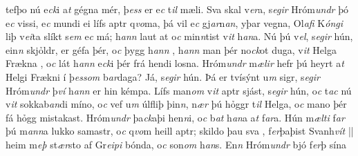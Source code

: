 tefþo  nú e\textit{ck}i
a\textit{t} gégna  mér, þ\textit{ess} er e\textit{c}
t\textit{il}  mæli. Sva skal v\textit{er}a, s\textit{egir} Hróm\textit{undr}  þó  e\textit{c} vissi,   e\textit{c} mundi ei lífs aptr q\textit{vo}ma, þá vil e\textit{c}
gj\textit{ar}n\textit{an}, yþar vegna, Ol\textit{afi}
K\textit{óngi} liþ v\textit{ei}ta slíkt s\textit{em} e\textit{c} má; 
h\textit{ann} laut at   o\textit{c} min\textit{n}tist v\textit{it} h\textit{an}a. 
Nú   þú v\textit{el}, s\textit{egir} hún,   ein\textit{n} skjỏldr, er   géfa þér, o\textit{c} þygg h\textit{ann} ,  h\textit{ann} man þér no\textit{ck}ot duga,    v\textit{it} Helga Frækna  , o\textit{c} lát h\textit{ann} e\textit{ck}i þér frá hendi losna.
Hróm\textit{undr} m\textit{ælir} hefr þú heyrt a\textit{t} Helgi Frækni   í þ\textit{ess}\textit{om} b\textit{ar}daga?  Já,
s\textit{egir} hún. Þá er tvísýnt u\textit{m} sigr, s\textit{egir}
Hróm\textit{undr} þ\textit{ví}  h\textit{ann} er  hin   kémpa. Lífs man\textit{om} v\textit{it} aptr sjást, s\textit{egir} hún, o\textit{c} t\textit{ac} nú v\textit{it} sokkab\textit{an}di
míno, o\textit{c} vef u\textit{m}  úlfliþ  þin\textit{n}, n\textit{ær} þú hỏggr t\textit{il} Helga,
o\textit{c} mano þér fá hỏgg  mistakast. Hróm\textit{undr}
þa\textit{ck}aþi hen\textit{n}i, o\textit{c} b\textit{at} h\textit{an}a   a\textit{t} f\textit{ar}a. Hún m\textit{ælti} f\textit{ar} þú
m\textit{ann}a lukko samastr, o\textit{c} q\textit{vo}m  heill   aptr; skildo þau sva  , f\textit{er}þaþist Svanh\textit{vít} 
|| 
heim    
m\textit{eþ} st\textit{ær}sto   af Gr\textit{eipi} bónda, o\textit{c} son\textit{om} h\textit{an}s. En\textit{n} Hróm\textit{undr} bjó f\textit{er}þ sína
